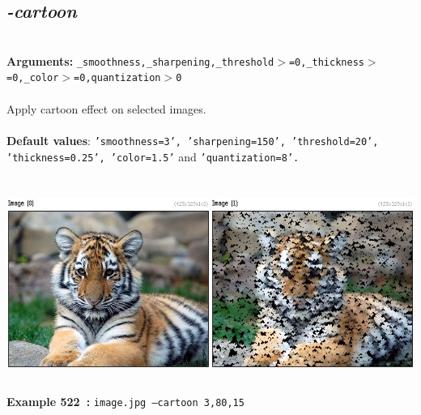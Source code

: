 \documentclass[a4paper,11pt,twoside]{book}
\begin{document}
\subsection{\emph{-cartoon} }\vspace*{-0.5em}
~\\\textbf{Arguments: } 
{\small \texttt{\_smoothness,\_sharpening,\_threshold$>$=0,\_thickness$>$=0,\_color$>$=0,quantization$>$0}}\\~\\
Apply cartoon effect on selected images.
~\\~\\\textbf{Default values}: {\small \texttt{'smoothness=3', 'sharpening=150', 'threshold=20', 'thickness=0.25', 'color=1.5'} and \texttt{'quantization=8'.}}
\begin{center}\includegraphics[keepaspectratio=true,height=7cm,width=\textwidth]{img/gmic_def522.jpg}\\
{\footnotesize \textbf{Example 522~:} \texttt{image.jpg --cartoon 3,80,15}}
\end{center}
\end{document}
